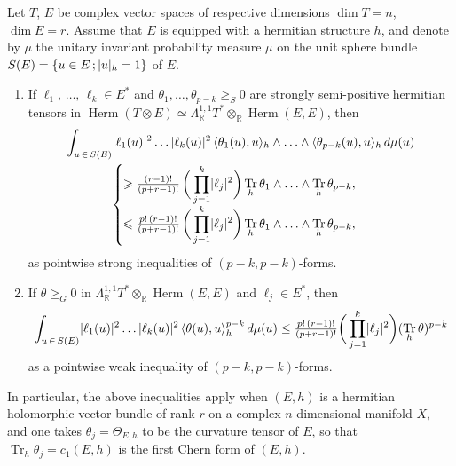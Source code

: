 \documentclass[AHL,Unicode,longabstracts,published]{cedram}
\DeclareMathOperator{\Herm}{Herm}
\DeclareMathOperator{\Tr}{Tr}
\DeclarePairedDelimiter{\abs}{\lvert}{\rvert}
\newcommand*\bR{\mathbb{R}}
\let\leq\leqslant
\let\geq\geqslant
\newcommand*{\alphenumi}{\renewcommand*{\theenumi}{\alph{enumi}}}
\begin{document}
\begin{prop}\label{prop:Chern_curv_inequalities}
Let $T$, $E$ be complex vector spaces of respective dimensions $\dim T=n$, $\dim E=r$. Assume that $E$ is equipped with a hermitian structure $h$, and denote by $\mu$ the unitary invariant probability measure $\mu$ on the unit sphere bundle $S(E)=\{u\in E\,;\abs{u}_h=1\}$ of $E$.
\begin{enumerate}\alphenumi
\item\label{item:Chern_curv_inequality1}
If $\ell_1,\,\dotsc,\,\ell_k\in E^*$ and $\theta_1,\dotsc,\theta_{p-k}\geq_S 0$ are strongly semi-positive hermitian tensors in
$\Herm(T\otimes E)\simeq\Lambda_\bR^{1,1}T^*\otimes_\bR\Herm(E,E)$, then
\begin{multline*}
\int_{u\,\in\,S(E)}\abs{\ell_1(u)}^2\ldots\abs{\ell_k(u)}^2\,
\langle\theta_1(u),u\rangle_h\wedge\ldots
\wedge\langle\theta_{p-k}(u),u\rangle_h\,d\mu(u)
\\
\begin{cases}
\displaystyle
\geq \tfrac{(r-1)!}{ (p+r-1)!}\,\bigg(\prod_{j=1}^k\abs{\ell_j}^2\bigg)
\Tr_h\theta_1\wedge\ldots\wedge\Tr_h\theta_{p-k},\\
\displaystyle
\leq \tfrac{p!\,(r-1)!}{ (p+r-1)!}\,\bigg(\prod_{j=1}^k\abs{\ell_j}^2\bigg)
\Tr_h\theta_1\wedge\ldots\wedge\Tr_h\theta_{p-k},
\end{cases}
\end{multline*}
as pointwise strong inequalities of $(p-k,p-k)$-forms.
\item\label{item:Chern_curv_inequality2}
If $\theta\geq_G 0$ in $\Lambda_\bR^{1,1}T^*\otimes_\bR\Herm(E,E)$ and $\ell_j\in E^*$, then
\[
\int_{u\,\in\,S(E)}\abs{\ell_1(u)}^2\ldots\abs{\ell_k(u)}^2\,
\langle\theta(u),u\rangle_h^{p-k}\,d\mu(u)\le
\tfrac{p!\,(r-1)!}{ (p+r-1)!}\bigg(\prod_{j=1}^k\abs{\ell_j}^2\bigg)(\Tr_h\theta)^{p-k}
\]
as a pointwise weak inequality of $(p-k,p-k)$-forms.
\end{enumerate}
In particular, the above inequalities apply when
$(E,h)$ is a hermitian holomorphic vector bundle of rank $r$ on a complex $n$-dimensional manifold $X$, and one takes
$\theta_j=\Theta_{E,h}$ to be the curvature tensor of $E$, so that
$\Tr_h\theta_j=c_1(E,h)$ is the first Chern form of $(E,h)$.
\end{prop}
\end{document}
